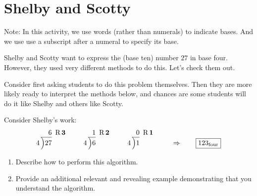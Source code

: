 \newpage
\section{Shelby and Scotty}\label{A:SS}

Note: In this activity, we use words (rather than numerals) to indicate bases.  
And we use use a subscript after a numeral to specify its base.  

Shelby and Scotty want to express the (base ten) number $27$ in base
four. However, they used very different methods to do this. Let's check
them out.

\begin{teachingnote}
Consider first asking students to do this problem themselves.  Then they are more likely ready to interpret the methods below, and chances are some students will do it like Shelby and others like Scotty. 
\end{teachingnote}

\begin{prob} Consider Shelby's work:
\[
4\,\begin{tabular}[b]{@{}r@{} r}
$6$ &\, R\,$\boldsymbol{3}$\\ \cline{1-1}
\Big)\begin{tabular}[t]{@{}l@{}}
$27$ 
\end{tabular}
\end{tabular}
\qquad
4\,\begin{tabular}[b]{@{}r@{} r}
$1$ &\, R\,$\boldsymbol{2}$\\ \cline{1-1}
\Big)\begin{tabular}[t]{@{}l@{}}
$6$ 
\end{tabular}
\end{tabular}
\qquad
4\,\begin{tabular}[b]{@{}r@{} r}
$0$ &\, R\,$\boldsymbol{1}$\\ \cline{1-1}
\Big)\begin{tabular}[t]{@{}l@{}}
$1$ 
\end{tabular}
\end{tabular} \qquad \Rightarrow \qquad \fbox{$123_\textrm{four}$}
\]
\begin{enumerate}
\item Describe how to perform this algorithm.
\item Provide an additional relevant and revealing example
  demonstrating that you understand the algorithm.
\end{enumerate}
\end{prob}


